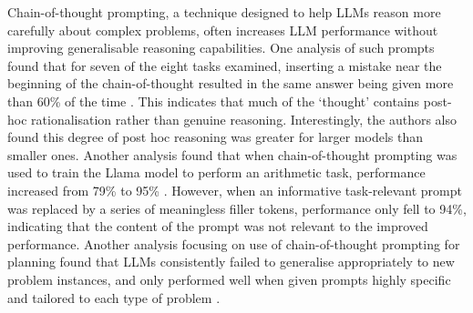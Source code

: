 \documentclass{article}
\begin{document}
Chain-of-thought prompting, a technique designed to help LLMs reason more carefully about complex problems, often increases LLM performance without improving generalisable reasoning capabilities. One analysis of such prompts found that for seven of the eight tasks examined, inserting a mistake near the beginning of the chain-of-thought resulted in the same answer being given more than 60\% of the time \citep{lanham2023measuring}. This indicates that much of the ‘thought’ contains post-hoc rationalisation rather than genuine reasoning. Interestingly, the authors also found this degree of post hoc reasoning was greater for larger models than smaller ones. Another analysis found that when chain-of-thought prompting was used to train the Llama model to perform an arithmetic task, performance increased from 79\% to 95\% \citep{pfau2024let}. However, when an informative task-relevant prompt was replaced by a series of meaningless filler tokens, performance only fell to 94\%, indicating that the content of the prompt was not relevant to the improved performance. Another analysis focusing on use of chain-of-thought prompting for planning found that LLMs consistently failed to generalise appropriately to new problem instances, and only performed well when given prompts highly specific and tailored to each type of problem \citep{stechly2024chain}.
\end{document}
